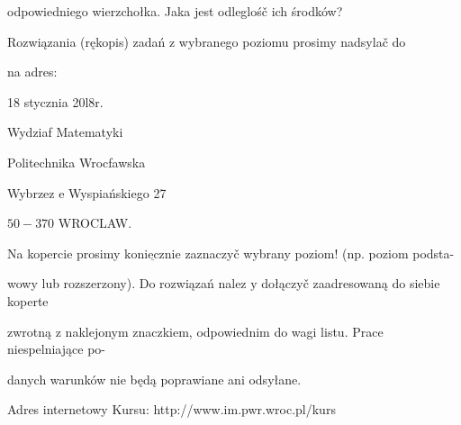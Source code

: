 \documentclass[a4paper,12pt]{article}
\begin{document}
odpowiedniego wierzchołka. Jaka jest odleglośč ich środków?

Rozwiązania (rękopis) zadań z wybranego poziomu prosimy nadsylač do

na adres:

18 stycznia 20l8r.

Wydziaf Matematyki

Politechnika Wrocfawska

Wybrzez $\mathrm{e}$ Wyspiańskiego 27

$50-370$ WROCLAW.

Na kopercie prosimy $\underline{\mathrm{k}\mathrm{o}\mathrm{n}\mathrm{i}\mathrm{e}\mathrm{c}\mathrm{z}\mathrm{n}\mathrm{i}\mathrm{e}}$ zaznaczyč wybrany poziom! (np. poziom podsta-

wowy lub rozszerzony). Do rozwiązań nalez $\mathrm{y}$ dołączyč zaadresowaną do siebie koperte

zwrotną $\mathrm{z}$ naklejonym znaczkiem, odpowiednim do wagi listu. Prace niespelniające po-

danych warunków nie będą poprawiane ani odsyłane.

Adres internetowy Kursu: http://www.im.pwr.wroc.pl/kurs
\end{document}
